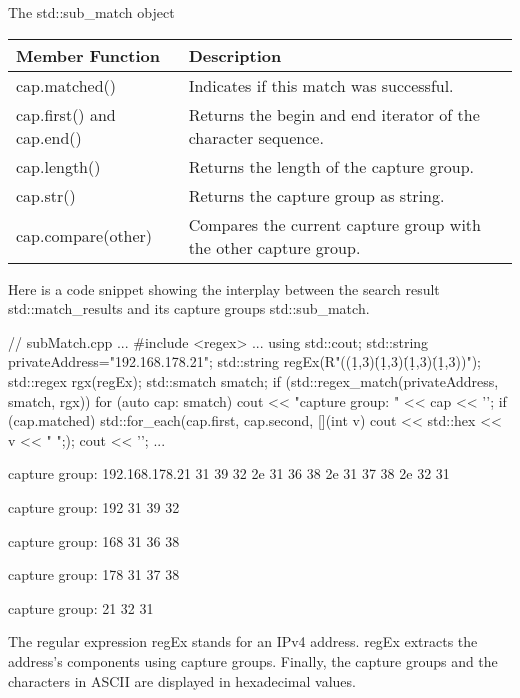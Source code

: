 \begin{center}
The std::sub\_match object
\end{center}

\begin{longtable}[c]{|l|l|}
\hline
\textbf{Member Function} & \textbf{Description}                     \\ \hline
\endfirsthead
%
\endhead
%
cap.matched()            & Indicates if this match was successful.  \\ \hline
cap.first() and cap.end() & Returns the begin and end iterator of the character sequence.    \\ \hline
cap.length()             & Returns the length of the capture group. \\ \hline
cap.str()                & Returns the capture group as string.     \\ \hline
cap.compare(other)        & Compares the current capture group with the other capture group. \\ \hline
\end{longtable}

Here is a code snippet showing the interplay between the search result std::match\_results and its capture groups std::sub\_match.


\begin{cpp}
// subMatch.cpp
...
#include <regex>
...
using std::cout;
std::string privateAddress="192.168.178.21";
std::string regEx(R"((\d{1,3})\.(\d{1,3})\.(\d{1,3})\.(\d{1,3}))");
std::regex rgx(regEx);
std::smatch smatch;
if (std::regex_match(privateAddress, smatch, rgx)){
	for (auto cap: smatch){
		cout << "capture group: " << cap << '\n';
		if (cap.matched){
			std::for_each(cap.first, cap.second, [](int v){
				cout << std::hex << v << " ";});
			cout << '\n';
		}
	}
}
...
\end{cpp}

\begin{shell}
capture group: 192.168.178.21
31 39 32 2e 31 36 38 2e 31 37 38 2e 32 31

capture group: 192
31 39 32

capture group: 168
31 36 38

capture group: 178
31 37 38

capture group: 21
32 31
\end{shell}

The regular expression regEx stands for an IPv4 address. regEx extracts the address’s components using capture groups. Finally, the capture groups and the characters in ASCII are displayed in hexadecimal values.















